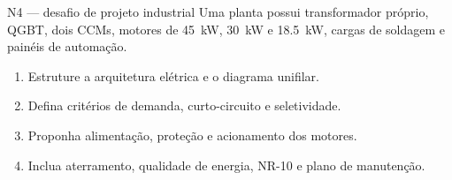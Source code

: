 \begin{frame}{N4 — desafio de projeto industrial}
\small
Uma planta possui transformador próprio, QGBT, dois CCMs, motores de \SI{45}{kW}, \SI{30}{kW} e \SI{18.5}{kW}, cargas de soldagem e painéis de automação.
\begin{enumerate}
\item Estruture a arquitetura elétrica e o diagrama unifilar.
\item Defina critérios de demanda, curto-circuito e seletividade.
\item Proponha alimentação, proteção e acionamento dos motores.
\item Inclua aterramento, qualidade de energia, NR-10 e plano de manutenção.
\end{enumerate}
\end{frame}

